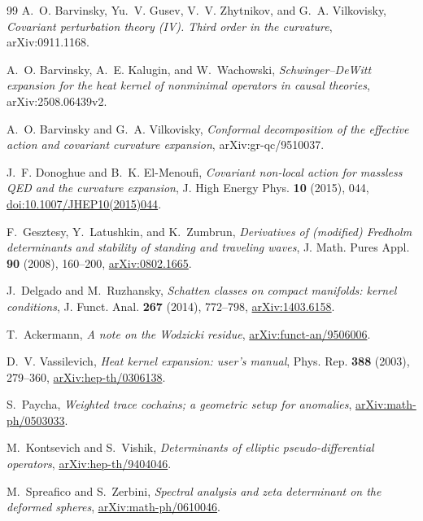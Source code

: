 \documentclass[11pt]{article}
\theoremstyle{definition}
\theoremstyle{remark}
\begin{document}
\begin{thebibliography}{99}
A.~O. Barvinsky, Yu.~V. Gusev, V.~V. Zhytnikov, and G.~A. Vilkovisky,
\emph{Covariant perturbation theory (IV). Third order in the curvature},
arXiv:0911.1168.

A.~O. Barvinsky, A.~E. Kalugin, and W.~Wachowski,
\emph{Schwinger--DeWitt expansion for the heat kernel of nonminimal
operators in causal theories},
arXiv:2508.06439v2.

A.~O. Barvinsky and G.~A. Vilkovisky,
\emph{Conformal decomposition of the effective action and covariant
curvature expansion},
arXiv:gr-qc/9510037.

J.~F. Donoghue and B.~K. El-Menoufi,
\emph{Covariant non-local action for massless QED and the curvature
expansion},
J. High Energy Phys. \textbf{10} (2015), 044,
\href{https://doi.org/10.1007/JHEP10(2015)044}
{doi:10.1007/JHEP10(2015)044}.

F.~Gesztesy, Y.~Latushkin, and K.~Zumbrun,
\emph{Derivatives of (modified) Fredholm determinants and stability of
standing and traveling waves},
J. Math. Pures Appl. \textbf{90} (2008), 160--200,
\href{https://arxiv.org/abs/0802.1665}{arXiv:0802.1665}.

J.~Delgado and M.~Ruzhansky,
\emph{Schatten classes on compact manifolds: kernel conditions},
J. Funct. Anal. \textbf{267} (2014), 772--798,
\href{https://arxiv.org/abs/1403.6158}{arXiv:1403.6158}.

T.~Ackermann,
\emph{A note on the Wodzicki residue},
\href{https://arxiv.org/abs/funct-an/9506006}{arXiv:funct-an/9506006}.

D.~V. Vassilevich,
\emph{Heat kernel expansion: user's manual},
Phys. Rep. \textbf{388} (2003), 279--360,
\href{https://arxiv.org/abs/hep-th/0306138}{arXiv:hep-th/0306138}.

S.~Paycha,
\emph{Weighted trace cochains; a geometric setup for anomalies},
\href{https://arxiv.org/abs/math-ph/0503033}{arXiv:math-ph/0503033}.

M.~Kontsevich and S.~Vishik,
\emph{Determinants of elliptic pseudo-differential operators},
\href{https://arxiv.org/abs/hep-th/9404046}{arXiv:hep-th/9404046}.

M.~Spreafico and S.~Zerbini,
\emph{Spectral analysis and zeta determinant on the deformed spheres},
\href{https://arxiv.org/abs/math-ph/0610046}{arXiv:math-ph/0610046}.

\end{thebibliography}
\end{document}
